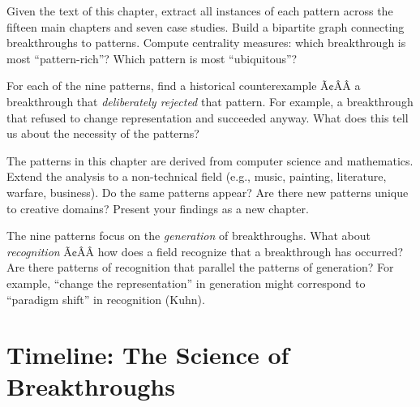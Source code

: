 \begin{exercise}[Computational]
Given the text of this chapter, extract all instances of each pattern across the fifteen main chapters and seven case studies. Build a bipartite graph connecting breakthroughs to patterns. Compute centrality measures: which breakthrough is most ``pattern-rich''? Which pattern is most ``ubiquitous''?
\end{exercise}

\begin{exercise}[Research]
For each of the nine patterns, find a historical counterexample Ã¢ÂÂ a breakthrough that \emph{deliberately rejected} that pattern. For example, a breakthrough that refused to change representation and succeeded anyway. What does this tell us about the necessity of the patterns?
\end{exercise}

\begin{exercise}[Research]
The patterns in this chapter are derived from computer science and mathematics. Extend the analysis to a non-technical field (e.g., music, painting, literature, warfare, business). Do the same patterns appear? Are there new patterns unique to creative domains? Present your findings as a new chapter.
\end{exercise}

\begin{exercise}[Research]
The nine patterns focus on the \emph{generation} of breakthroughs. What about \emph{recognition} Ã¢ÂÂ how does a field recognize that a breakthrough has occurred? Are there patterns of recognition that parallel the patterns of generation? For example, ``change the representation'' in generation might correspond to ``paradigm shift'' in recognition (Kuhn).
\end{exercise}

\section{Timeline: The Science of Breakthroughs}
\label{sec:anatomy:timeline}

